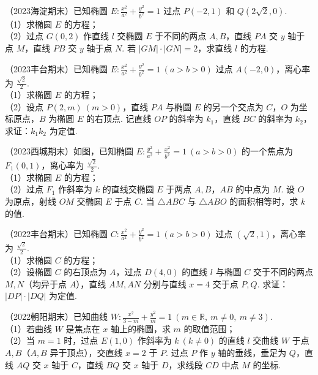 \begin{example} %
（2023海淀期末）已知椭圆 $E:\frac{x^2}{a^2}+\frac{y^2}{b^2}=1$ 过点 $P(-2,1)$ 和 $Q(2\sqrt{2},0)$.\\
（1）求椭圆 $E$ 的方程；\\
（2）过点 $G(0,2)$ 作直线 $l$ 交椭圆 $E$ 于不同的两点 $A,B$，直线 $PA$ 交 $y$ 轴于点 $M$，直线 $PB$ 交 $y$ 轴于点 $N$. 若 $\lvert GM\rvert\cdot\lvert GN\rvert=2$，求直线 $l$ 的方程.
\end{example}

\begin{example} %
（2023丰台期末）已知椭圆 $E:\frac{x^2}{a^2}+\frac{y^2}{b^2}=1\ (a>b>0)$ 过点 $A(-2,0)$，离心率为 $\frac{\sqrt{2}}{2}$.\\
（1）求椭圆 $E$ 的方程；\\
（2）设点 $P(2,m)\ (m>0)$，直线 $PA$ 与椭圆 $E$ 的另一个交点为 $C$，$O$ 为坐标原点，$B$ 为椭圆 $E$ 的右顶点. 记直线 $OP$ 的斜率为 $k_1$，直线 $BC$ 的斜率为 $k_2$，求证：$k_1k_2$ 为定值.
\end{example}

\begin{example} %
（2023西城期末）如图，已知椭圆 $E:\frac{y^2}{a^2}+\frac{x^2}{b^2}=1\ (a>b>0)$ 的一个焦点为 $F_1(0,1)$，离心率为 $\frac{\sqrt{2}}{2}$.\\
（1）求椭圆 $E$ 的方程；\\
（2）过点 $F_1$ 作斜率为 $k$ 的直线交椭圆 $E$ 于两点 $A,B$，$AB$ 的中点为 $M$. 设 $O$ 为原点，射线 $OM$ 交椭圆 $E$ 于点 $C$. 当 $\triangle ABC$ 与 $\triangle ABO$ 的面积相等时，求 $k$ 的值.
\end{example}

\begin{example} %
（2022丰台期末）已知椭圆 $C:\frac{x^2}{a^2}+\frac{y^2}{b^2}=1\ (a>b>0)$ 过点 $(\sqrt{2},1)$，离心率为 $\frac{\sqrt{2}}{2}$.\\
（1）求椭圆 $C$ 的方程；\\
（2）设椭圆 $C$ 的右顶点为 $A$，过点 $D(4,0)$ 的直线 $l$ 与椭圆 $C$ 交于不同的两点 $M,N$（均异于点 $A$），直线 $AM,AN$ 分别与直线 $x=4$ 交于点 $P,Q$. 求证：$\lvert DP\rvert\cdot\lvert DQ\rvert$ 为定值.
\end{example}

\begin{example} %
（2022朝阳期末）已知曲线 $W:\frac{x^2}{3-m}+\frac{y^2}{m}=1\ (m\in\mathbb{R},\ m\neq0,\ m\neq3)$.\\
（1）若曲线 $W$ 是焦点在 $x$ 轴上的椭圆，求 $m$ 的取值范围；\\
（2）当 $m=1$ 时，过点 $E(1,0)$ 作斜率为 $k\ (k\neq0)$ 的直线 $l$ 交曲线 $W$ 于点 $A,B$（$A,B$ 异于顶点），交直线 $x=2$ 于 $P$. 过点 $P$ 作 $y$ 轴的垂线，垂足为 $Q$，直线 $AQ$ 交 $x$ 轴于 $C$，直线 $BQ$ 交 $x$ 轴于 $D$，求线段 $CD$ 中点 $M$ 的坐标.
\end{example}

